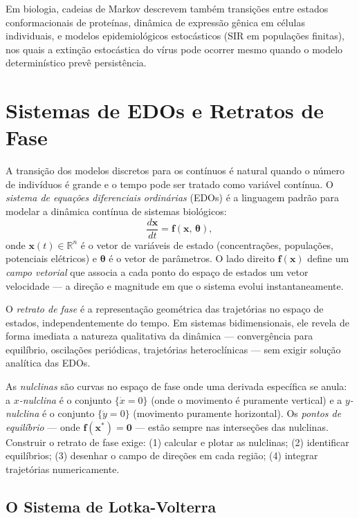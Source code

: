 Em biologia, cadeias de Markov descrevem também transições entre estados conformacionais de
proteínas, dinâmica de expressão gênica em células individuais, e modelos epidemiológicos
estocásticos (SIR em populações finitas), nos quais a extinção estocástica do vírus pode
ocorrer mesmo quando o modelo determinístico prevê persistência.


\section{Sistemas de EDOs e Retratos de Fase}

A transição dos modelos discretos para os contínuos é natural quando o número de
indivíduos é grande e o tempo pode ser tratado como variável contínua. O
\emph{sistema de equações diferenciais ordinárias} (EDOs) é a linguagem padrão para
modelar a dinâmica contínua de sistemas biológicos:
\begin{equation}
  \frac{d\mathbf{x}}{dt} = \mathbf{f}(\mathbf{x},\, \boldsymbol{\theta}),
\end{equation}
onde $\mathbf{x}(t) \in \mathbb{R}^n$ é o vetor de variáveis de estado (concentrações,
populações, potenciais elétricos) e $\boldsymbol{\theta}$ é o vetor de parâmetros.
O lado direito $\mathbf{f}(\mathbf{x})$ define um \emph{campo vetorial} que associa a
cada ponto do espaço de estados um vetor velocidade --- a direção e magnitude em que o
sistema evolui instantaneamente.

O \emph{retrato de fase} é a representação geométrica das trajetórias no espaço de
estados, independentemente do tempo. Em sistemas bidimensionais, ele revela de forma
imediata a natureza qualitativa da dinâmica --- convergência para equilíbrio, oscilações
periódicas, trajetórias heteroclínicas --- sem exigir solução analítica das EDOs.

As \emph{nulclinas} são curvas no espaço de fase onde uma derivada específica se anula:
a \emph{$x$-nulclina} é o conjunto $\{\dot{x} = 0\}$ (onde o movimento é puramente
vertical) e a \emph{$y$-nulclina} é o conjunto $\{\dot{y} = 0\}$ (movimento puramente
horizontal). Os \emph{pontos de equilíbrio} --- onde $\mathbf{f}(\mathbf{x}^*) = \mathbf{0}$
--- estão sempre nas interseções das nulclinas. Construir o retrato de fase exige: (1)
calcular e plotar as nulclinas; (2) identificar equilíbrios; (3) desenhar o campo de
direções em cada região; (4) integrar trajetórias numericamente.

\subsection{O Sistema de Lotka-Volterra}

